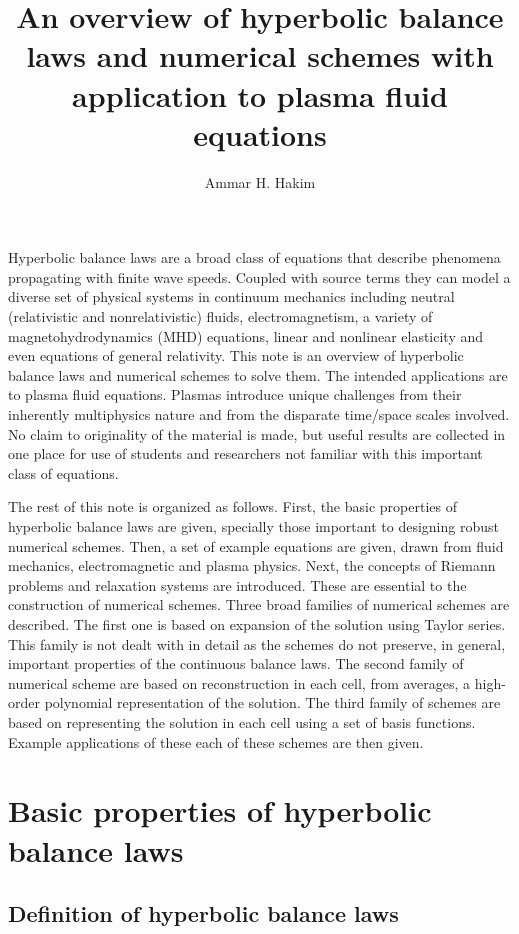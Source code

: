\documentclass[11pt, reqno]{amsart}
\title[Hyperbolic balance laws]{An overview of hyperbolic balance laws
  and numerical schemes with application to plasma fluid equations}%
\author{Ammar H. Hakim}%
\date{}
\theoremstyle{definition}
\begin{document}
\maketitle

Hyperbolic balance laws are a broad class of equations that describe
phenomena propagating with finite wave speeds. Coupled with source
terms they can model a diverse set of physical systems in continuum
mechanics including neutral (relativistic and nonrelativistic) fluids,
electromagnetism, a variety of magnetohydrodynamics (MHD) equations,
linear and nonlinear elasticity and even equations of general
relativity. This note is an overview of hyperbolic balance laws and
numerical schemes to solve them. The intended applications are to
plasma fluid equations. Plasmas introduce unique challenges from their
inherently multiphysics nature and from the disparate time/space
scales involved. No claim to originality of the material is made, but
useful results are collected in one place for use of students and
researchers not familiar with this important class of equations.

The rest of this note is organized as follows. First, the basic
properties of hyperbolic balance laws are given, specially those
important to designing robust numerical schemes. Then, a set of
example equations are given, drawn from fluid mechanics,
electromagnetic and plasma physics. Next, the concepts of Riemann
problems and relaxation systems are introduced. These are essential to
the construction of numerical schemes. Three broad families of
numerical schemes are described. The first one is based on expansion
of the solution using Taylor series. This family is not dealt with in
detail as the schemes do not preserve, in general, important
properties of the continuous balance laws. The second family of
numerical scheme are based on reconstruction in each cell, from
averages, a high-order polynomial representation of the solution. The
third family of schemes are based on representing the solution in each
cell using a set of basis functions. Example applications of these
each of these schemes are then given.

\section{Basic properties of hyperbolic balance laws}

\subsection{Definition of hyperbolic balance laws}
\end{document}
